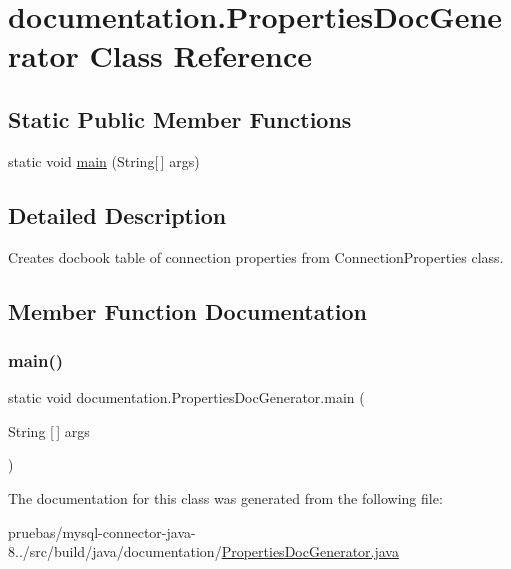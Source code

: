 \hypertarget{classdocumentation_1_1_properties_doc_generator}{}\section{documentation.\+Properties\+Doc\+Generator Class Reference}
\label{classdocumentation_1_1_properties_doc_generator}
\subsection*{Static Public Member Functions}
\begin{DoxyCompactItemize}
\item 
static void \mbox{\hyperlink{classdocumentation_1_1_properties_doc_generator_a7b5ce70d175861f13d3693cc66882d3b}{main}} (String\mbox{[}$\,$\mbox{]} args)
\end{DoxyCompactItemize}


\subsection{Detailed Description}
Creates docbook table of connection properties from Connection\+Properties class. 

\subsection{Member Function Documentation}
\mbox{\label{classdocumentation_1_1_properties_doc_generator_a7b5ce70d175861f13d3693cc66882d3b}} 
\subsubsection{\texorpdfstring{main()}{main()}}
{\footnotesize\ttfamily static void documentation.\+Properties\+Doc\+Generator.\+main (\begin{DoxyParamCaption}\item[{String \mbox{[}$\,$\mbox{]}}]{args }\end{DoxyParamCaption})\hspace{0.3cm}{\ttfamily [static]}}



The documentation for this class was generated from the following file\+:\begin{DoxyCompactItemize}
\item 
pruebas/mysql-\/connector-\/java-\/8../src/build/java/documentation/\mbox{\hyperlink{_properties_doc_generator_8java}{Properties\+Doc\+Generator.\+java}}\end{DoxyCompactItemize}
